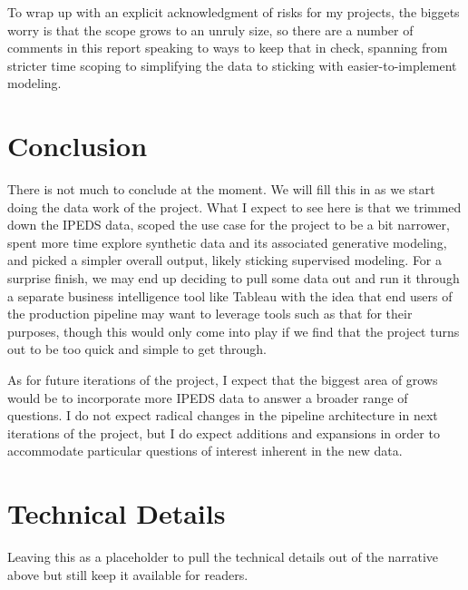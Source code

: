 \documentclass[sigconf, authorversion, nonacm]{acmart}
\begin{document}
    To wrap up with an explicit acknowledgment of risks for my projects, the biggets worry is that the scope grows to an unruly size, so there are a number of comments in this report speaking to ways to keep that in check, spanning from stricter time scoping to simplifying the data to sticking with easier-to-implement modeling.

\section{Conclusion}
    There is not much to conclude at the moment. We will fill this in as we start doing the data work of the project. What I expect to see here is that we trimmed down the IPEDS data, scoped the use case for the project to be a bit narrower, spent more time explore synthetic data and its associated generative modeling, and picked a simpler overall output, likely sticking supervised modeling. For a surprise finish, we may end up deciding to pull some data out and run it through a separate business intelligence tool like Tableau with the idea that end users of the production pipeline may want to leverage tools such as that for their purposes, though this would only come into play if we find that the project turns out to be too quick and simple to get through.

    As for future iterations of the project, I expect that the biggest area of grows would be to incorporate more IPEDS data to answer a broader range of questions. I do not expect radical changes in the pipeline architecture in next iterations of the project, but I do expect additions and expansions in order to accommodate particular questions of interest inherent in the new data.




\appendix

\section{Technical Details}
    Leaving this as a placeholder to pull the technical details out of the narrative above but still keep it available for readers.
\end{document}
